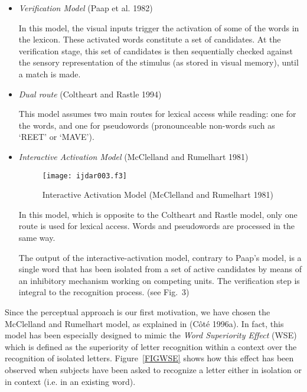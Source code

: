 \documentclass[ijdar]{svjour}
\begin{document}
\begin{itemize}

\item {\it Verification Model} (Paap et al. 1982)

In this model, the visual inputs trigger the activation of some of the words in the lexicon.
These activated words constitute a set of candidates.
At the verification stage, this set of candidates is then sequentially checked against the sensory representation of the stimulus (as stored in visual memory), until a match is made.

\item {\it Dual route} (Coltheart and Rastle 1994)

This model assumes two main routes for lexical access while reading: one for the words, and one for pseudowords (pronounceable non-words such as `REET' or `MAVE').

\item {\it Interactive Activation Model} (McClelland and\break
Rumelhart 1981)

\begin{figure}%
\texttt{[image: ijdar003.f3]}%
\caption{Interactive Activation Model (McClelland and Rumelhart 1981)}
\label{FIGMODEL}
\end{figure}

In this model, which is opposite to the Coltheart and Rastle model, only one route is used for lexical access.
Words and pseudowords are processed in the same way.

The output of the interactive-activation model, contrary to Paap's model, is a single word that has been isolated from a set of active candidates by means of an inhibitory mechanism working on competing units.
The verification step is integral to the recognition process.
(see Fig.~3)


\end{itemize}


Since the perceptual approach is our first motivation, we have chosen the McClelland and Rumelhart model, as explained in (C\^ot\'e 1996a).
In fact, this model has been especially designed to mimic the {\it Word Superiority Effect} (WSE) which is defined as the superiority of letter recognition within a context over the recognition of isolated letters.
Figure~\ref{FIGWSE} shows how this effect has been observed when subjects have been asked to recognize a letter either in isolation or in context ({i.e.} in an existing word).
\end{document}
